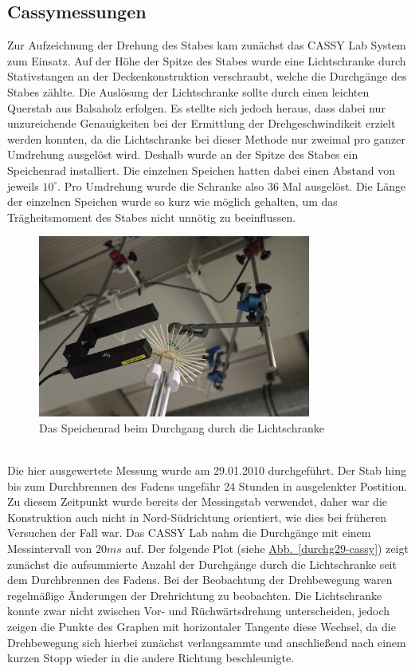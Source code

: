 \documentclass[11pt]{scrartcl}
\begin{document}
\subsection{Cassymessungen} %
Zur Aufzeichnung der Drehung des Stabes kam zun\"achst das CASSY Lab System zum Einsatz. Auf der H\"ohe der Spitze des Stabes wurde eine Lichtschranke durch Stativstangen an der Deckenkonstruktion verschraubt, welche die Durchg\"ange des Stabes z\"ahlte. Die Ausl\"osung der Lichtschranke sollte durch einen leichten Querstab aus Balsaholz erfolgen. Es stellte sich jedoch heraus, dass dabei nur unzureichende Genauigkeiten bei der Ermittlung der Drehgeschwindikeit erzielt werden konnten, da die Lichtschranke bei dieser Methode nur zweimal pro ganzer Umdrehung ausgel\"ost wird. Deshalb wurde an der Spitze des Stabes ein \glqq Speichenrad\grqq{} installiert. Die einzelnen Speichen hatten dabei einen Abstand von jeweils $10^\circ$. Pro Umdrehung wurde die Schranke also 36 Mal ausgel\"ost. Die L\"ange der einzelnen Speichen wurde so kurz wie m\"oglich gehalten, um das Tr\"agheitsmoment des Stabes nicht unn\"otig zu beeinflussen.
\begin{figure}[ht]
\begin{center}
\includegraphics[width=0.8\textwidth]{images/lichtschranke.jpg}
\end{center}
\vspace{-1.5\baselineskip}
\caption{Das Speichenrad beim Durchgang durch die Lichtschranke}
\label{lichtschranke}
\end{figure}
\\Die hier ausgewertete Messung wurde am 29.01.2010 durchgef\"uhrt. Der Stab hing bis zum Durchbrennen des Fadens ungef\"ahr 24 Stunden in ausgelenkter Postition. Zu diesem Zeitpunkt wurde bereits der Messingstab verwendet, daher war die Konstruktion auch nicht in Nord-S\"udrichtung orientiert, wie dies bei fr\"uheren Versuchen der Fall war. Das CASSY Lab nahm die Durchg\"ange mit einem Messintervall von $20ms$ auf. Der folgende Plot (siehe \hyperref[durchg29-cassy]{Abb.~\ref{durchg29-cassy}}) zeigt zun\"achst die aufsummierte Anzahl der Durchg\"ange durch die Lichtschranke seit dem Durchbrennen des Fadens. Bei der Beobachtung der Drehbewegung waren regelm\"a\ss{}ige \"Anderungen der Drehrichtung zu beobachten. Die Lichtschranke konnte zwar nicht zwischen Vor- und R\"uchw\"artsdrehung unterscheiden, jedoch zeigen die Punkte des Graphen mit horizontaler Tangente diese Wechsel, da die Drehbewegung sich hierbei zun\"achst verlangsammte und anschlie\ss{}end nach einem kurzen Stopp wieder in die andere Richtung beschleunigte.
\end{document}

